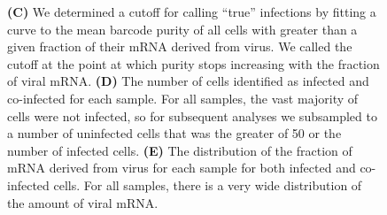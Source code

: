 \documentclass[9pt,lineno]{elife}
\begin{document}
\begin{figure}
{{\bf (C)}
We determined a cutoff for calling ``true'' infections by fitting a curve to the mean barcode purity of all cells with greater than a given fraction of their mRNA derived from virus.
We called the cutoff at the point at which purity stops increasing with the fraction of viral mRNA.
{\bf (D)}
The number of cells identified as infected and co-infected for each sample.
For all samples, the vast majority of cells were not infected, so for subsequent analyses we subsampled to a number of uninfected cells that was the greater of 50 or the number of infected cells.
{\bf (E)} 
The distribution of the fraction of mRNA derived from virus for each sample for both infected and co-infected cells.
For all samples, there is a very wide distribution of the amount of viral mRNA.
}
\end{figure}
\end{document}
